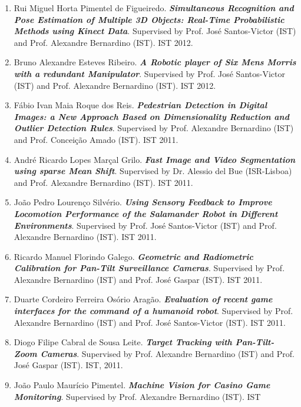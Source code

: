 \documentclass[
]{article}
\begin{document}
\begin{enumerate}
  Filipe FernandesVeiga. \emph{\textbf{Robotic Grasp Optimisation from
  Contact Force Analysis}}. Supervised by Prof. Alexandre Bernardino
  (IST) and Prof. José Santos-Victor (IST). IST 2012.
\item
  Rui Miguel Horta Pimentel de Figueiredo. \emph{\textbf{Simultaneous
  Recognition and Pose Estimation of Multiple 3D Objects: Real-Time
  Probabilistic Methods using Kinect Data}}. Supervised by Prof. José
  Santos-Victor (IST) and Prof. Alexandre Bernardino (IST). IST 2012.
\item
  Bruno Alexandre Esteves Ribeiro. \emph{\textbf{A Robotic player of Six
  Men\textquotesingle s Morris with a redundant Manipulator}}.
  Supervised by Prof. José Santos-Victor (IST) and Prof. Alexandre
  Bernardino (IST). IST 2012.
\item
  Fábio Ivan Maia Roque dos Reis. \emph{\textbf{Pedestrian Detection in
  Digital Images: a New Approach Based on Dimensionality Reduction and
  Outlier Detection Rules}}. Supervised by Prof. Alexandre Bernardino
  (IST) and Prof. Conceição Amado (IST). IST 2011.
\item
  André Ricardo Lopes Marçal Grilo. \emph{\textbf{Fast Image and Video
  Segmentation using sparse Mean Shift}}. Supervised by Dr. Alessio del
  Bue (ISR-Lisboa) and Prof. Alexandre Bernardino (IST). IST 2011.
\item
  João Pedro Lourenço Silvério. \emph{\textbf{Using Sensory Feedback to
  Improve Locomotion Performance of the Salamander Robot in Different
  Environments}}. Supervised by Prof. José Santos-Victor (IST) and Prof.
  Alexandre Bernardino (IST). IST 2011.
\item
  Ricardo Manuel Florindo Galego. \emph{\textbf{Geometric and
  Radiometric Calibration for Pan-Tilt Surveillance Cameras}}.
  Supervised by Prof. Alexandre Bernardino (IST) and Prof. José Gaspar
  (IST). IST 2011.
\item
  Duarte Cordeiro Ferreira Osório Aragão. \emph{\textbf{Evaluation of
  recent game interfaces for the command of a humanoid robot}}.
  Supervised by Prof. Alexandre Bernardino (IST) and Prof. José
  Santos-Victor (IST). IST 2011.
\item
  Diogo Filipe Cabral de Sousa Leite. \emph{\textbf{Target Tracking with
  Pan-Tilt-Zoom Cameras}}. Supervised by Prof. Alexandre Bernardino
  (IST) and Prof. José Gaspar (IST). IST, 2011.
\item
  João Paulo Maurício Pimentel. \emph{\textbf{Machine Vision for Casino
  Game Monitoring}}. Supervised by Prof. Alexandre Bernardino (IST). IST

\end{enumerate}
\end{document}
